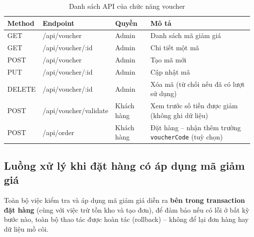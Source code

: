 \documentclass[12pt,a4paper]{article}
\begin{document}
\begin{table}[H]
\centering
\small
\begin{tabular}{@{}p{1.6cm}p{3.4cm}p{2cm}p{5.9cm}@{}}
\toprule
\textbf{Method} & \textbf{Endpoint} & \textbf{Quyền} & \textbf{Mô tả} \\
\midrule
GET & /api/voucher & Admin & Danh sách mã giảm giá \\
GET & /api/voucher/:id & Admin & Chi tiết một mã \\
POST & /api/voucher & Admin & Tạo mã mới \\
PUT & /api/voucher/:id & Admin & Cập nhật mã \\
DELETE & /api/voucher/:id & Admin & Xóa mã (từ chối nếu đã có lượt sử dụng) \\
POST & /api/voucher/validate & Khách hàng & Xem trước số tiền được giảm (không ghi dữ liệu) \\
POST & /api/order & Khách hàng & Đặt hàng -- nhận thêm trường \texttt{voucherCode} (tuỳ chọn) \\
\bottomrule
\end{tabular}
\caption{Danh sách API của chức năng voucher}
\end{table}

\subsection{Luồng xử lý khi đặt hàng có áp dụng mã giảm giá}

Toàn bộ việc kiểm tra và áp dụng mã giảm giá diễn ra \textbf{bên trong transaction đặt hàng} (cùng với việc trừ tồn kho và tạo đơn), để đảm bảo nếu có lỗi ở bất kỳ bước nào, toàn bộ thao tác được hoàn tác (rollback) -- không để lại đơn hàng hay dữ liệu mồ côi.
\end{document}
